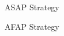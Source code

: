 \documentclass[]{article}
\begin{document}
\begin{figure}
	\resizebox{\textwidth}{!}{%
		
		}
\caption{ASAP Strategy}
\end{figure}

\begin{figure}
	\resizebox{\textwidth}{!}{%
		
		}
\caption{AFAP Strategy}
\end{figure}
\end{document}
